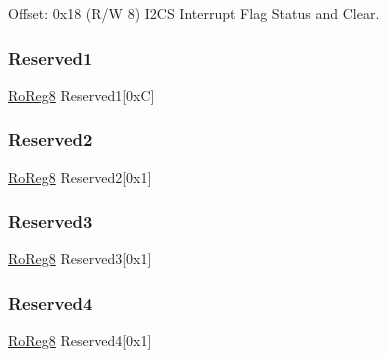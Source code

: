Offset\+: 0x18 (R/W 8) I2\+CS Interrupt Flag Status and Clear. 

\mbox{\label{struct_sercom_i2cs_a95d7f624017e1390364c8facee43c5a9}} 
\subsubsection{\texorpdfstring{Reserved1}{Reserved1}}
{\footnotesize\ttfamily \mbox{\hyperlink{group___s_a_m_d21_e15_a__definitions_ga0d957f1433aaf5d70e4dc2b68288442d}{Ro\+Reg8}} Reserved1\mbox{[}0x\+C\mbox{]}}

\mbox{\label{struct_sercom_i2cs_a99ee50bfa44e107c16a546d778dcdcc7}} 
\subsubsection{\texorpdfstring{Reserved2}{Reserved2}}
{\footnotesize\ttfamily \mbox{\hyperlink{group___s_a_m_d21_e15_a__definitions_ga0d957f1433aaf5d70e4dc2b68288442d}{Ro\+Reg8}} Reserved2\mbox{[}0x1\mbox{]}}

\mbox{\label{struct_sercom_i2cs_ae12c3e940f27988a085afebe2f779a21}} 
\subsubsection{\texorpdfstring{Reserved3}{Reserved3}}
{\footnotesize\ttfamily \mbox{\hyperlink{group___s_a_m_d21_e15_a__definitions_ga0d957f1433aaf5d70e4dc2b68288442d}{Ro\+Reg8}} Reserved3\mbox{[}0x1\mbox{]}}

\mbox{\label{struct_sercom_i2cs_a5ca570382e961b7801aeafc161de2571}} 
\subsubsection{\texorpdfstring{Reserved4}{Reserved4}}
{\footnotesize\ttfamily \mbox{\hyperlink{group___s_a_m_d21_e15_a__definitions_ga0d957f1433aaf5d70e4dc2b68288442d}{Ro\+Reg8}} Reserved4\mbox{[}0x1\mbox{]}}

